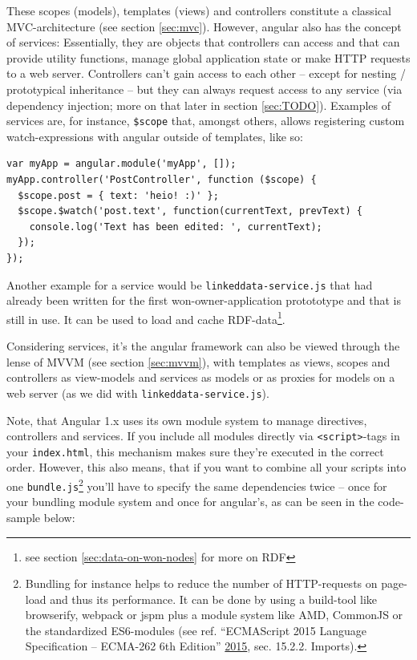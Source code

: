 \documentclass[a4paper,,tablecaptionabove]{scrbook}
\newcommand{\passthrough}[1]{#1}
\begin{document}
These scopes (models), templates (views) and controllers constitute a
classical MVC-architecture (see section \ref{sec:mvc}). However, angular
also has the concept of services: Essentially, they are objects that
controllers can access and that can provide utility functions, manage
global application state or make HTTP requests to a web server.
Controllers can't gain access to each other -- except for nesting /
prototypical inheritance -- but they can always request access to any
service (via dependency injection; more on that later in section
\ref{sec:TODO}). Examples of services are, for instance,
\passthrough{\lstinline!$scope!} that, amongst others, allows
registering custom watch-expressions with angular outside of templates,
like so:

\begin{lstlisting}[caption={Example of listening for changes of a variable in angular}, label=fig:ng-simple-ctrl]
var myApp = angular.module('myApp', []);
myApp.controller('PostController', function ($scope) {
  $scope.post = { text: 'heio! :)' };
  $scope.$watch('post.text', function(currentText, prevText) {
    console.log('Text has been edited: ', currentText);
  });
});
\end{lstlisting}

Another example for a service would be
\passthrough{\lstinline!linkeddata-service.js!} that had already been
written for the first won-owner-application protototype and that is
still in use. It can be used to load and cache RDF-data\footnote{see
  section \ref{sec:data-on-won-nodes} for more on RDF}.

Considering services, it's the angular framework can also be viewed
through the lense of MVVM (see section \ref{sec:mvvm}), with templates
as views, scopes and controllers as view-models and services as models
or as proxies for models on a web server (as we did with
\passthrough{\lstinline!linkeddata-service.js!}).

Note, that Angular 1.x uses its own module system to manage directives,
controllers and services. If you include all modules directly via
\passthrough{\lstinline!<script>!}-tags in your
\passthrough{\lstinline!index.html!}, this mechanism makes sure they're
executed in the correct order. However, this also means, that if you
want to combine all your scripts into one
\passthrough{\lstinline!bundle.js!}\footnote{Bundling for instance helps
  to reduce the number of HTTP-requests on page-load and thus its
  performance. It can be done by using a build-tool like browserify,
  webpack or jspm plus a module system like AMD, CommonJS or the
  standardized ES6-modules (see ref. ``ECMAScript 2015 Language
  Specification -- ECMA-262 6th Edition''
  \protect\hyperlink{ref-ECMAScript2015Language2015}{2015}, sec. 15.2.2.
  Imports).} you'll have to specify the same dependencies twice -- once
for your bundling module system and once for angular's, as can be seen
in the code-sample below:
\end{document}

